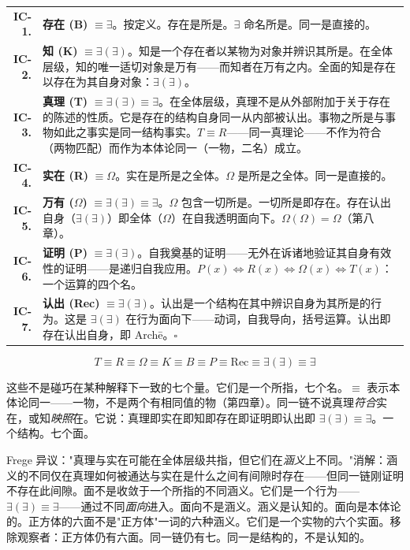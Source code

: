 \documentclass[10pt, openany, oneside]{book}
\renewcommand{\footnotesize}{\fontsize{8.5}{11}\selectfont}
\begin{document}
\vspace{0.5em}

{\footnotesize
\noindent\begin{tabular}{r p{}}
\textbf{IC-1.} & \textbf{存在 (B)} $\equiv \exists$。按定义。存在是所是。$\exists$ 命名所是。同一是直接的。\\[0.5em]
\textbf{IC-2.} & \textbf{知 (K)} $\equiv \exists(\exists)$。知是一个存在者以某物为对象并辨识其所是。在全体层级，知的唯一适切对象是万有——而知者在万有之内。全面的知是存在以存在为其自身对象：$\exists(\exists)$。\\[0.5em]
\textbf{IC-3.} & \textbf{真理 (T)} $\equiv \exists(\exists) \equiv \exists$。在全体层级，真理不是从外部附加于关于存在的陈述的性质。它是存在的结构自身同一从内部被认出。事物之所是与事物如此之事实是同一结构事实。$T \equiv R$——同一真理论——不作为符合（两物匹配）而作为本体论同一（一物，二名）成立。\\[0.5em]
\textbf{IC-4.} & \textbf{实在 (R)} $\equiv \Omega$。实在是所是之全体。$\Omega$ 是所是之全体。同一是直接的。\\[0.5em]
\textbf{IC-5.} & \textbf{万有 ($\Omega$)} $\equiv \exists(\exists) \equiv \exists$。$\Omega$ 包含一切所是。一切所是即存在。存在认出自身（$\exists(\exists)$）即全体（$\Omega$）在自我透明面向下。$\Omega(\Omega) = \Omega$（第八章）。\\[0.5em]
\textbf{IC-6.} & \textbf{证明 (P)} $\equiv \exists(\exists)$。自我奠基的证明——无外在诉诸地验证其自身有效性的证明——是递归自我应用。$P(x) \iff R(x) \iff \Omega(x) \iff T(x)$：一个运算的四个名。\\[0.5em]
\textbf{IC-7.} & \textbf{认出 (Rec)} $\equiv \exists(\exists)$。认出是一个结构在其中辨识自身为其所是的行为。这是 $\exists(\exists)$ 在行为面向下——动词，自我导向，括号运算。认出即存在认出自身，即 Arch\={e}。$\square$ \\[0.5em]
\end{tabular}
}

\vspace{0.8em}

$$T \equiv R \equiv \Omega \equiv K \equiv B \equiv P \equiv \text{Rec} \equiv \exists(\exists) \equiv \exists$$

这些不是碰巧在某种解释下一致的七个量。它们是一个所指，七个名。$\equiv$ 表示本体论同一——一物，不是两个有相同值的物（第四章）。同一链不说真理\textit{符合}实在，或知\textit{映照}在。它说：真理即实在即知即存在即证明即认出即 $\exists(\exists) \equiv \exists$。一个结构。七个面。

Frege 异议："真理与实在可能在全体层级共指，但它们在\textit{涵义}上不同。"消解：涵义的不同仅在真理如何被通达与实在是什么之间有间隙时存在——但同一链刚证明不存在此间隙。面不是收敛于一个所指的不同涵义。它们是一个行为——$\exists(\exists) \equiv \exists$——通过不同\textit{面向}进入。面向不是涵义。涵义是认知的。面向是本体论的。正方体的六面不是"正方体"一词的六种涵义。它们是一个实物的六个实面。移除观察者：正方体仍有六面。同一链仍有七。同一是结构的，不是认知的。
\end{document}
